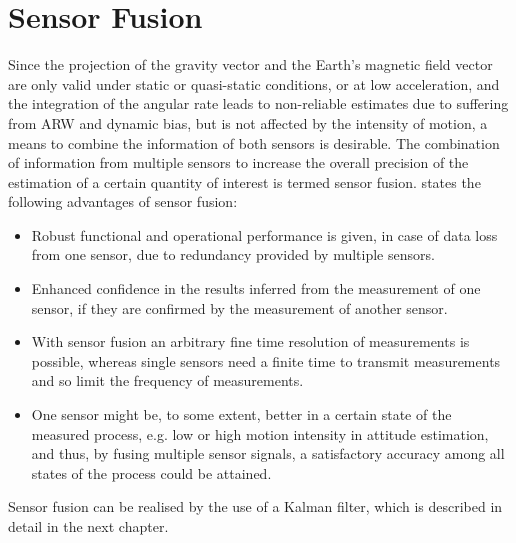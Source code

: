\section{Sensor Fusion}

Since the projection of the gravity vector and the Earth's magnetic field vector are only valid under static or quasi-static conditions, or at low acceleration, and the integration of the angular rate leads to non-reliable estimates due to suffering from \gls{ARW} and dynamic bias, but is not affected by the intensity of motion, a means to combine the information of both sensors is desirable. The combination of information from multiple sensors to increase the overall precision of the estimation of a certain quantity of interest is termed sensor fusion. \citeauthor{raol2009multi} \cite{raol2009multi} states the following advantages of sensor fusion:
 
\begin{itemize}
\item Robust functional and operational performance is given, in case of data loss from one sensor, due to redundancy provided by multiple sensors.
\item Enhanced confidence in the results inferred from the measurement of one sensor, if they are confirmed by the measurement of another sensor.
\item With sensor fusion an arbitrary fine time resolution of measurements is possible, whereas single sensors need a finite time to transmit measurements and so limit the frequency of measurements.
\item One sensor might be, to some extent, better in a certain state of the measured process, e.g. low or high motion intensity in attitude estimation, and thus, by fusing multiple sensor signals, a satisfactory accuracy among all states of the process could be attained.
\end{itemize}

\noindent
Sensor fusion can be realised by the use of a Kalman filter, which is described in detail in the next chapter.


